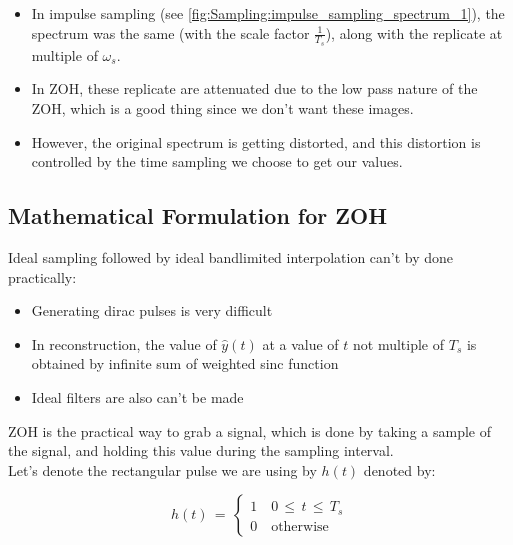 \documentclass[12pt,a4paper]{book}
\begin{document}
\begin{itemize}

\item In impulse sampling (see \autoref{fig:Sampling:impulse_sampling_spectrum_1}), the spectrum was the same (with the scale factor $\displaystyle\frac{1}{T_s}$), along with the replicate at multiple of $\omega_s$.


\item In ZOH, these replicate are attenuated due to the low pass nature of the ZOH, which is a good thing since we don't want these images.

\item However, the original spectrum is getting distorted, and this distortion is controlled by the time sampling we choose to get our values. 

\end{itemize}

\subsection{Mathematical Formulation for ZOH}

Ideal sampling followed by ideal bandlimited interpolation can't by done practically:

\begin{itemize}

\item Generating dirac pulses is very difficult

\item In reconstruction, the value of $\hat{y}(t)$ at a value of $t$ not multiple of $T_s$ is obtained by infinite sum of weighted sinc function

\item Ideal filters are also can't be made

\end{itemize}


ZOH is the practical way to grab a signal, which is done by taking a sample of the signal, and holding this value during the sampling interval.\\

Let's denote the rectangular pulse we are using by $h(t)$ denoted by:

\begin{equation}
h(t)\, = \, \begin{cases}
1 \quad 0 \, \leq \, t \, \leq \, T_s \\
0 \quad \text{otherwise}
\end{cases}
\end{equation}
\end{document}
